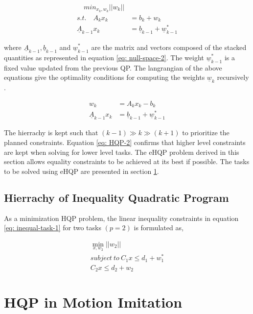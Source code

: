 \begin{align}
    \label{eq: HQP}
    \quad min_{x_k, w_k}||w_k|| \\
    \mathit{s.t.} \quad    A_kx_k &= b_k + w_k \\
    \underline{A}_{k - 1}x_k &= \underline{b}_{k - 1} + \underline{w}_{k - 1}^*
\end{align}

where $\underline{A}_{k - 1}, \underline{b}_{k - 1}$ and $\underline{w}_{k - 1}^*$ are the matrix and vectors composed of the stacked quantities 
as represented in equation \ref{eq: null-space-2}. The weight $\underline{w}_{k - 1}^*$ is a fixed value updated from the previous QP.
The langrangian of the above equations give the optimality conditions for computing the weights $\underline{w}_k$ 
recursively \cite{escande2014hierarchical}.

\begin{align}
    \label{eq: HQP-2}
    w_k &= A_kx_k - b_k \\
    \underline{A}_{k - 1}x_k &= \underline{b}_{k - 1} + \underline{w}_{k - 1}^ *
\end{align}

The hierrachy is kept such that $(k -1) \gg k \gg (k + 1)$ to prioritize the planned constraints. Equation \ref{eq: HQP-2} confirms that 
higher level constraints are kept when solving for lower level tasks. The eHQP problem derived in this section allows equality constraints to
 be achieved at its best if possible.  The tasks to be solved using eHQP are presented in section \ref{sec: HQP-imitation}.

\subsection{Hierrachy of Inequality Quadratic Program}

As a minimization HQP problem, the linear inequality constraints in equation \ref{eq: inequal-task-1} for two tasks $(p = 2)$ is formulated as,

\begin{eqnarray}
    \label{eq: inequal-task-2}
    \min_{x, w_2} ||w_2|| \\
    \mathit{subject \ to} \ C_{1}x \le d_1 + w_1^* \\
    C_2x \le d_2 + w_2
\end{eqnarray}


\section{HQP in Motion Imitation}
\label{sec: HQP-imitation}

